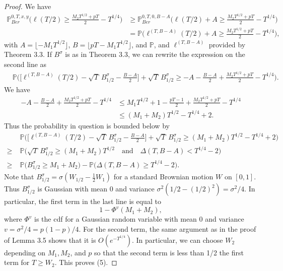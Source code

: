 \documentclass[12pt]{article}
\begin{document}
	\begin{proof}
		
		We have
		\begin{align*}
		\mathbb{P}^{0,T,x,y}_{Ber}\bigg( \ell( T/2 )  \geq \frac{M_2T^{1/2} + p T}{2} - T^{1/4} \bigg) &\geq \mathbb{P}^{0,T,0,B-A}_{Ber}\bigg( \ell( T/2 ) + A  \geq \frac{M_2T^{1/2} + p T}{2} - T^{1/4} \bigg)\\
		&= \mathbb{P}\bigg( \ell^{(T,B-A)}( T/2 ) + A  \geq \frac{M_2T^{1/2} + p T}{2} - T^{1/4} \bigg),
		\end{align*}
		with $A = \lfloor -M_1T^{1/2}\rfloor$, $B = \lfloor pT-M_1T^{1/2}\rfloor$, and $\mathbb{P}$, and $\ell^{(T,B-A)}$ provided by Theorem 3.3. If $B^\sigma$ is as in Theorem 3.3, we can rewrite the expression on the second line as
		\begin{align*}
		& \mathbb{P}\bigg( \bigg[\ell^{(T,B-A)}( T/2 ) -\sqrt{T}\,B^\sigma_{1/2} - \frac{B-A}{2}\bigg] + \sqrt{T}\,B^\sigma_{1/2}  \geq -A - \frac{B-A}{2} + \frac{M_2T^{1/2} + p T}{2} - T^{1/4} \bigg).
		\end{align*}
		We have
		\begin{align*}
		-A - \frac{B-A}{2} + \frac{M_2T^{1/2} + p T}{2} - T^{1/4} & \leq M_1T^{1/2} + 1 - \frac{pT-1}{2} + \frac{M_2T^{1/2} + p T}{2} - T^{1/4}\\
		&\leq (M_1 + M_2)T^{1/2} - T^{1/4} + 2.
		\end{align*}
		Thus the probability in question is bounded below by
		\begin{align*}
		& \mathbb{P}\bigg( \bigg[\ell^{(T,B-A)}( T/2 ) -\sqrt{T}\,B^\sigma_{1/2} - \frac{B-A}{2}\bigg] + \sqrt{T}\,B^\sigma_{1/2}  \geq (M_1 + M_2)T^{1/2} - T^{1/4} + 2 \bigg)\\
		\geq \; & \mathbb{P}\bigg( \sqrt{T}\,B^\sigma_{1/2} \geq (M_1 + M_2)T^{1/2} \quad \mathrm{and} \quad \Delta(T,B-A) < T^{1/4} - 2 \bigg)\\
		\geq \; & \mathbb{P}\big( B^\sigma_{1/2} \geq M_1 + M_2 \big) - \mathbb{P}\big( \Delta(T,B-A) \geq T^{1/4} - 2 \big).
		\end{align*}
		Note that $B^\sigma_{1/2} = \sigma(W_{1/2} - \frac{1}{2}W_1)$ for a standard Brownian motion $W$ on $[0,1]$. Thus $B^\sigma_{1/2}$ is Gaussian with mean 0 and variance $\sigma^2(1/2-(1/2)^2) = \sigma^2/4$. In particular, the first term in the last line is equal to
		\[
		1 - \Phi^v(M_1+M_2),
		\]
		where $\Phi^v$ is the cdf for a Gaussian random variable with mean 0 and variance $v=\sigma^2/4 = p(1-p)/4$. For the second term, the same argument as in the proof of Lemma 3.5 shows that it is $O(e^{-T^{1/4}})$. In particular, we can choose $W_2$ depending on $M_1,M_2$, and $p$ so that the second term is less than 1/2 the first term for $T\geq W_2$. This proves (5).
		
	\end{proof}
\end{document}

